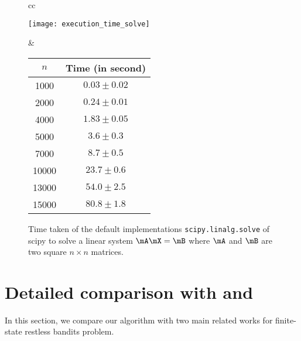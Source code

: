 \begin{figure}[ht]
    \centering
    \begin{tabular}{cc}
        \begin{minipage}{0.5\linewidth}
            \texttt{[image: execution\_time\_solve]}
        \end{minipage}
        &\begin{minipage}{0.45\linewidth}
            \begin{tabular}{|c|c|}
                \hline
                $n$ & Time (in second)\\\hline
                1000 & $ 0.03\pm0.02$ \\
                2000 & $ 0.24\pm0.01$ \\
                4000 & $ 1.83\pm0.05$ \\
                5000 & $ 3.6\pm0.3$ \\
                7000 & $ 8.7\pm0.5$ \\
                10000 & $23.7\pm0.6$ \\
                13000 & $54.0\pm2.5$ \\
                15000 & $80.8\pm1.8$ \\                
                \hline
            \end{tabular}
        \end{minipage}
    \end{tabular}
    \caption{Time taken of the default implementations \texttt{scipy.linalg.solve} of scipy to solve a linear system $\mA\mX=\mB$ where $\mA$ and $\mB$ are two square $n\times n$ matrices.}
    \label{fig:benchmark_inverse}
\end{figure}

\section{Detailed comparison with \texorpdfstring{\cite{akbarzadeh2020conditions} and \cite{nino2020fast}}{Akbarzadeh et al. 2020 and Nino Mora 2020.}}
\label{apx:comparison}

In this section, we compare our algorithm with two main related works for finite-state restless bandits problem.

